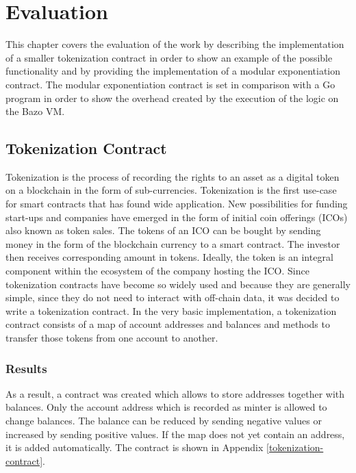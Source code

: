 \chapter{Evaluation}
\label{evaluation}
This chapter covers the evaluation of the work by describing the implementation of a smaller tokenization contract in order to show an example of the possible functionality and by providing the implementation of a modular exponentiation contract. The modular exponentiation contract is set in comparison with a Go program in order to show the overhead created by the execution of the logic on the Bazo VM.

\section{Tokenization Contract}
\label{tokencontract}
Tokenization is the process of recording the rights to an asset as a digital token on a blockchain in the form of sub-currencies. \cite{eth_whitepaper} Tokenization is the first use-case for smart contracts that has found wide application. New possibilities for funding start-ups and companies have emerged in the form of initial coin offerings (ICOs) also known as token sales. The tokens of an ICO can be bought by sending money in the form of the blockchain currency to a smart contract. The investor then receives corresponding amount in tokens. Ideally, the token is an integral component within the ecosystem of the company hosting the ICO. \cite{ico_pwc} Since tokenization contracts have become so widely used and because they are generally simple, since they do not need to interact with off-chain data, it was decided to write a tokenization contract. In the very basic implementation, a tokenization contract consists of a map of account addresses and balances and methods to transfer those tokens from one account to another. 

\subsection{Results}
As a result, a contract was created which allows to store addresses together with balances. Only the account address which is recorded as minter is allowed to change balances. The balance can be reduced by sending negative values or increased by sending positive values. If the map does not yet contain an address, it is added automatically. The contract is shown in Appendix \ref{tokenization-contract}.

